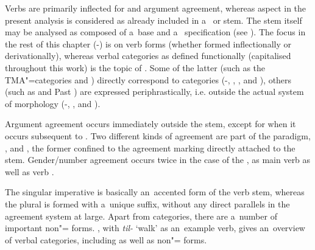 Verbs are primarily inflected for  and argument agreement, whereas aspect in the present analysis is considered as already included in a~ or  stem. The stem itself may be analysed as composed of a~base and a~ specification (see ). The focus in the rest of this chapter (-) is on verb forms (whether formed inflectionally or derivationally), whereas verbal categories as defined functionally (capitalised throughout this work) is the topic of . Some of the latter (such as the TMA"=categories  and ) directly correspond to  categories (-, , , and ), others (such as  and Past ) are expressed periphrastically, i.e. outside the actual system of  morphology (-, , and ). 


Argument agreement occurs immediately outside the stem, except for when it occurs subsequent to  . Two different kinds of agreement are part of the paradigm, , and , the former confined to the agreement marking directly attached to the  stem. Gender/number agreement occurs twice in the case of the , as main verb  as well as  verb . 


The singular imperative is basically an~accented form of the verb stem, whereas the plural is formed with a~unique suffix, without any direct parallels in the agreement system at large. Apart from   categories, there are a~number of important non"= forms. , with \textit{til-} `walk' as an~example verb, gives an~overview of verbal  categories, including  as well as non"= forms.


